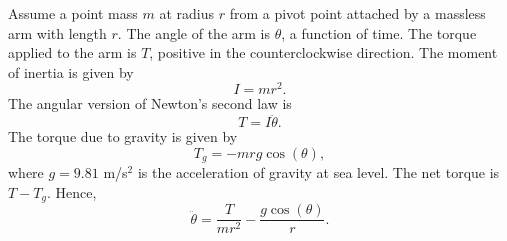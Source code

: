 \documentclass[pdftex]{book}
\begin{document}
\thispagestyle{empty}
\begin{center}
\end{center}
Assume a point mass $m$ at radius $r$ from a pivot point attached by a massless arm with length $r$.
The angle of the arm is $\theta$, a function of time.
The torque applied to the arm is $T$, positive in the counterclockwise direction.
The moment of inertia is given by
\[
I = m r^2 .
\]
The angular version of Newton's second law is
\[
T = I \ddot{\theta} .
\]
The torque due to gravity is given by
\[
T_g = - mrg \cos(\theta),
\]
where $g = 9.81$ m/s$^2$ is the acceleration of gravity at sea level.
The net torque is $T-T_g$.
Hence,
\[
\ddot{\theta} = \frac{T}{mr^2} - \frac{g \cos(\theta)}{r} .
\]
\end{document}
